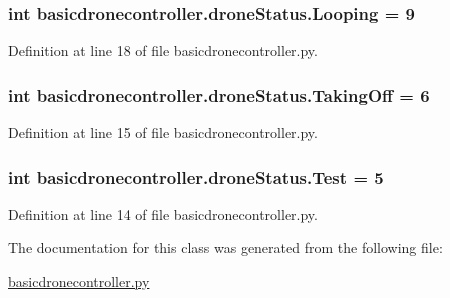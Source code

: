 \hypertarget{classbasicdronecontroller_1_1droneStatus_a17f3b8ae27dc6906ca523270a2247975}{
\subsubsection[{Looping}]{\setlength{\rightskip}{0pt plus 5cm}int basicdronecontroller.\-drone\-Status.\-Looping = 9\hspace{0.3cm}{\ttfamily [static]}}}\label{classbasicdronecontroller_1_1droneStatus_a17f3b8ae27dc6906ca523270a2247975}


Definition at line 18 of file basicdronecontroller.\-py.

\hypertarget{classbasicdronecontroller_1_1droneStatus_a922dc19950f805d567027f609b880e29}{
\subsubsection[{Taking\-Off}]{\setlength{\rightskip}{0pt plus 5cm}int basicdronecontroller.\-drone\-Status.\-Taking\-Off = 6\hspace{0.3cm}{\ttfamily [static]}}}\label{classbasicdronecontroller_1_1droneStatus_a922dc19950f805d567027f609b880e29}


Definition at line 15 of file basicdronecontroller.\-py.

\hypertarget{classbasicdronecontroller_1_1droneStatus_a9d9bfd54b7f837f4855e4cacb9cfb089}{
\subsubsection[{Test}]{\setlength{\rightskip}{0pt plus 5cm}int basicdronecontroller.\-drone\-Status.\-Test = 5\hspace{0.3cm}{\ttfamily [static]}}}\label{classbasicdronecontroller_1_1droneStatus_a9d9bfd54b7f837f4855e4cacb9cfb089}


Definition at line 14 of file basicdronecontroller.\-py.



The documentation for this class was generated from the following file\-:\begin{DoxyCompactItemize}
\item 
\hyperlink{basicdronecontroller_8py}{basicdronecontroller.\-py}\end{DoxyCompactItemize}
